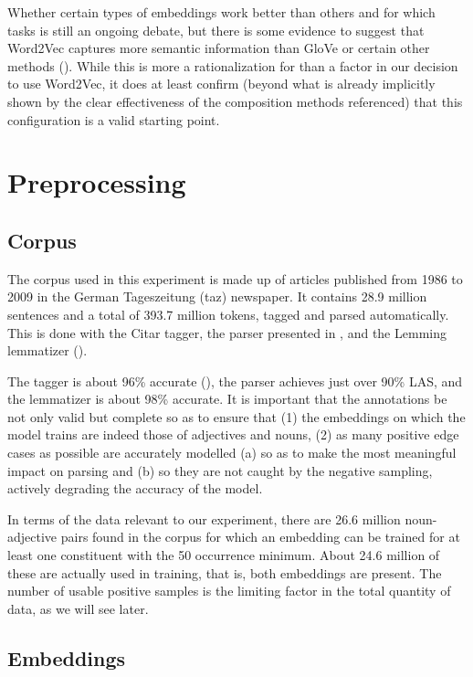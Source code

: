 \documentclass[a4paper, 12pt]{scrartcl}
\begin{document}
Whether certain types of embeddings work better than others and for which tasks is still an ongoing debate, but there is some evidence to suggest that Word2Vec captures more semantic information than GloVe or certain other methods (\cite{SchnabelEmbeddings}). While this is more a rationalization for than a factor in our decision to use Word2Vec, it does at least confirm (beyond what is already implicitly shown by the clear effectiveness of the composition methods referenced) that this configuration is a valid starting point.


\section{Preprocessing}

\subsection{Corpus}

The corpus used in this experiment is made up of articles published from 1986 to 2009 in the German Tageszeitung (taz) newspaper. It contains 28.9 million sentences and a total of 393.7 million tokens, tagged and parsed automatically. This is done with the Citar tagger, the parser presented in \cite{deKokParsing}, and the Lemming lemmatizer (\cite{Lemming}).

The tagger is about 96\% accurate (\cite{PlankVanNoord}), the parser achieves just over 90\% LAS, and the lemmatizer is about 98\% accurate. It is important that the annotations be not only valid but complete so as to ensure that (1) the embeddings on which the model trains are indeed those of adjectives and nouns, (2) as many positive edge cases as possible are accurately modelled (a) so as to make the most meaningful impact on parsing and (b) so they are not caught by the negative sampling, actively degrading the accuracy of the model.

In terms of the data relevant to our experiment, there are 26.6 million noun-adjective pairs found in the corpus for which an embedding can be trained for at least one constituent with the 50 occurrence minimum. About 24.6 million of these are actually used in training, that is, both embeddings are present. The number of usable positive samples is the limiting factor in the total quantity of data, as we will see later.

\subsection{Embeddings}
\end{document}
